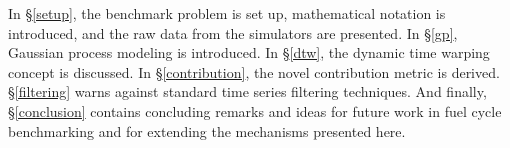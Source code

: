 In \S \ref{setup}, the benchmark problem is set up, mathematical notation is 
introduced,
and the raw data from the simulators are presented. In \S \ref{gp}, Gaussian 
process 
modeling is introduced. In \S \ref{dtw}, the dynamic time warping concept is
discussed. In \S \ref{contribution}, the novel contribution metric is 
derived.
\S \ref{filtering} warns against standard time series filtering
techniques. And finally, \S \ref{conclusion} contains concluding remarks
and ideas for future work in fuel cycle benchmarking and for 
extending the mechanisms presented here.
